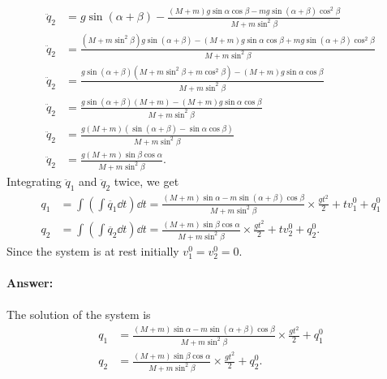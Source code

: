 \begin{align*}
    \ddot{q}_2 &= g \sin (\alpha + \beta) - \frac{(M + m) g \sin \alpha \cos \beta - m g \sin(\alpha + \beta) \cos^2 \beta}{M + m \sin^2 \beta}\\
    \ddot{q}_2 &= \frac
    {
        (M + m \sin^2 \beta) g \sin (\alpha + \beta) -
        (M + m) g \sin \alpha \cos \beta +
        m g \sin(\alpha + \beta) \cos^2\beta
    }
    {M + m \sin^2 \beta}\\
    \ddot{q}_2 &= \frac
    {
        g \sin (\alpha + \beta) (M + m\sin^2 \beta + m \cos^2 \beta) -
        (M + m) g \sin\alpha \cos\beta
    }
    {M + m \sin^2 \beta}\\
    \ddot{q}_2 &= \frac
    {
        g \sin (\alpha + \beta) (M + m) -
        (M + m) g \sin\alpha \cos\beta
    }
    {M + m \sin^2 \beta}\\
    \ddot{q}_2 &= \frac
    {
        g(M + m)
        (\sin (\alpha + \beta) -
        \sin\alpha \cos\beta)
    }
    {M + m \sin^2 \beta}\\
    \ddot{q}_2 &= \frac
    {
        g(M + m) \sin\beta \cos\alpha
    }
    {M + m \sin^2 \beta}.
\end{align*}
Integrating $\ddot{q}_1$ and $\ddot{q}_2$ twice, we get 
\begin{align}
    q_1 &= \int\left(\int \ddot{q_1} \dd t\right) \dd t = \frac{(M + m)  \sin \alpha - m  \sin(\alpha + \beta) \cos\beta}{M + m \sin^2 \beta} \times \frac{g t^2}{2} + t v_1^0 + q_1^0\\
    q_2 &= \int\left(\int \ddot{q_2} \dd t\right) \dd t =\frac{(M + m) \sin\beta \cos\alpha }{M + m \sin^2 \beta} \times \frac{g t^2}{2} + t v_2^0 + q_2^0.
\end{align}
Since the system is at rest initially $v_1^0 = v_2^0 = 0$.

\paragraph{Answer:} The solution of the system is 
\begin{align*}
    q_1 &= \frac{(M + m)  \sin \alpha - m  \sin(\alpha + \beta) \cos\beta}{M + m \sin^2 \beta} \times \frac{g t^2}{2} + q_1^0\\
    q_2 &= \frac{(M + m) \sin\beta \cos\alpha }{M + m \sin^2 \beta} \times \frac{g t^2}{2} + q_2^0.
\end{align*}